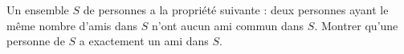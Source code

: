 Un ensemble $S$ de personnes a la propriété suivante : deux personnes ayant le même nombre d'amis dans $S$ n'ont aucun ami commun dans $S$. Montrer qu'une personne de $S$ a exactement un ami dans $S$.
